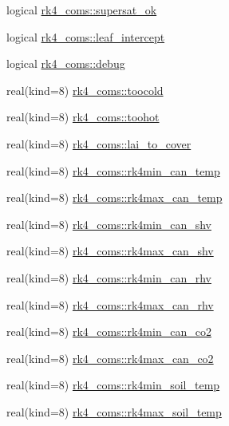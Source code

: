 \begin{DoxyCompactItemize}
logical \hyperlink{namespacerk4__coms_a304419c7dc18d710be779d2d1a1378e7}{rk4\+\_\+coms\+::supersat\+\_\+ok}
\item 
logical \hyperlink{namespacerk4__coms_ab6eb51e1fa8b861cc6fb6359631bdec3}{rk4\+\_\+coms\+::leaf\+\_\+intercept}
\item 
logical \hyperlink{namespacerk4__coms_a5abb49d2a6e86524f3c3bf3f67468c21}{rk4\+\_\+coms\+::debug}
\item 
real(kind=8) \hyperlink{namespacerk4__coms_ac687fa7b7b3d3a5b1d3bd179e62c8052}{rk4\+\_\+coms\+::toocold}
\item 
real(kind=8) \hyperlink{namespacerk4__coms_a759040e06196aa6e44844e731b1140ba}{rk4\+\_\+coms\+::toohot}
\item 
real(kind=8) \hyperlink{namespacerk4__coms_a5af034bb3daf3fd270550fe26a843ced}{rk4\+\_\+coms\+::lai\+\_\+to\+\_\+cover}
\item 
real(kind=8) \hyperlink{namespacerk4__coms_a5896e577e06a78e013f72e048e907250}{rk4\+\_\+coms\+::rk4min\+\_\+can\+\_\+temp}
\item 
real(kind=8) \hyperlink{namespacerk4__coms_a6eed732a4c1930bb16dbe70b959bb270}{rk4\+\_\+coms\+::rk4max\+\_\+can\+\_\+temp}
\item 
real(kind=8) \hyperlink{namespacerk4__coms_a0f723d7acf2f73c4f997825e4b79eb66}{rk4\+\_\+coms\+::rk4min\+\_\+can\+\_\+shv}
\item 
real(kind=8) \hyperlink{namespacerk4__coms_a8f00e104965b6c83b49b597f34d8432a}{rk4\+\_\+coms\+::rk4max\+\_\+can\+\_\+shv}
\item 
real(kind=8) \hyperlink{namespacerk4__coms_aea541e4460a2030f1873fb118b1b3341}{rk4\+\_\+coms\+::rk4min\+\_\+can\+\_\+rhv}
\item 
real(kind=8) \hyperlink{namespacerk4__coms_addc14b5fd10ebce828e187eb2e0c8101}{rk4\+\_\+coms\+::rk4max\+\_\+can\+\_\+rhv}
\item 
real(kind=8) \hyperlink{namespacerk4__coms_ab56f9190507acf74210f49d44165dd57}{rk4\+\_\+coms\+::rk4min\+\_\+can\+\_\+co2}
\item 
real(kind=8) \hyperlink{namespacerk4__coms_ab0d46d8c6ddc6f99dd0a0800217b712e}{rk4\+\_\+coms\+::rk4max\+\_\+can\+\_\+co2}
\item 
real(kind=8) \hyperlink{namespacerk4__coms_a4995d06d19518eaad240d240ce72ebf3}{rk4\+\_\+coms\+::rk4min\+\_\+soil\+\_\+temp}
\item 
real(kind=8) \hyperlink{namespacerk4__coms_ae58a286e741a74a2ef97b1b9c1244efd}{rk4\+\_\+coms\+::rk4max\+\_\+soil\+\_\+temp}
\item 

\end{DoxyCompactItemize}
